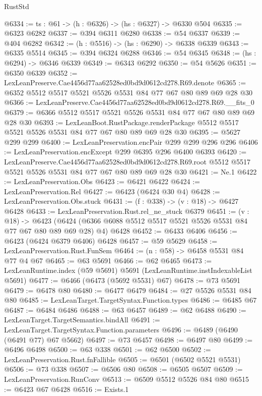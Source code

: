 \begin{lexlean}{RustStd}
\begin{coremodule}
@6334 := {ts : @61} -> (h : @6326) -> (hs : @6327) -> @6330 @504
@6335 := @6323 @6282
@6337 := @394 @6311 @6280
@6338 := @54 @6337
@6339 := @404 @6282
@6342 := (h : @5516) -> (hs : @6290) -> @6338 @6339
@6343 := @6335 @5514
@6345 := @394 @6324 @6288
@6346 := @54 @6345
@6348 := (hs : @6294) -> @6346 @6339
@6349 := @6343 @6292
@6350 := @54 @5626
@6351 := @6350 @6339
@6352 := LexLeanPreserve.Cae4456d77aa62528ed0bd9d0612cd278.R69.denote
@6365 := @6352 @5512 @5517 @5521 @5526 @5531 @84 @77 @67 @80 @89 @69 @28 @30
@6366 := LexLeanPreserve.Cae4456d77aa62528ed0bd9d0612cd278.R69.__fits_0
@6379 := @6366 @5512 @5517 @5521 @5526 @5531 @84 @77 @67 @80 @89 @69 @28 @30
@6393 := LexLeanBoot.RustPackage.renderPackage
    @5512
    @5517
    @5521
    @5526
    @5531
    @84
    @77
    @67
    @80
    @89
    @69
    @28
    @30
@6395 := @5627 @299 @299
@6400 := LexLeanPreservation.encPair @299 @299 @296 @296
@6406 := LexLeanPreservation.encExcept @299 @6395 @296 @6400 @6393
@6420 := LexLeanPreserve.Cae4456d77aa62528ed0bd9d0612cd278.R69.root
    @5512
    @5517
    @5521
    @5526
    @5531
    @84
    @77
    @67
    @80
    @89
    @69
    @28
    @30
@6421 := Ne.{1}
@6422 := LexLeanPreservation.Obs
@6423 := @6421 @6422
@6424 := LexLeanPreservation.Rel
@6427 := @6423 (@6424 @30 @4)
@6428 := LexLeanPreservation.Obs.stuck
@6431 := (f : @338) -> (v : @18) -> @6427 @6428
@6433 := LexLeanPreservation.Rust.rel_ne_stuck @6379
@6451 := (v : @18) ->
  @6423 (@6424 (@6366 @6088 @5512 @5517 @5521 @5526 @5531 @84 @77 @67 @80 @89 @69 @28) @4) @6428
@6452 := @6433 @6406
@6456 := @6423 (@6424 @6379 @6406) @6428
@6457 := @59 @5629
@6458 := LexLeanPreservation.Rust.FunSem
@6464 := (n : @58) -> @6458 @5531 @84 @77 @4 @67
@6465 := @63 @5691
@6466 := @62 @6465
@6473 := LexLeanRuntime.index (@59 @5691) @5691 (LexLeanRuntime.instIndexableList @5691)
@6477 := @6466 (@6473 (@5692 @5531) @67)
@6478 := @73 @5691
@6479 := @6478 @80
@6480 := @6477 @6479
@6484 := @27 @5526 @5531 @84 @80
@6485 := LexLeanTarget.TargetSyntax.Function.types
@6486 := @6485 @67
@6487 := @6484 @6486
@6488 := @63 @6457
@6489 := @62 @6488
@6490 := LexLeanTarget.TargetSemantics.bindAll
@6491 := LexLeanTarget.TargetSyntax.Function.parameters
@6496 := @6489 (@6490 (@6491 @77) @67 @5662)
@6497 := @73 @6457
@6498 := @6497 @80
@6499 := @6496 @6498
@6500 := @63 @338
@6501 := @62 @6500
@6502 := LexLeanPreservation.Rust.fnFallible
@6505 := @6501 (@6502 @5521 @5531)
@6506 := @73 @338
@6507 := @6506 @80
@6508 := @6505 @6507
@6509 := LexLeanPreservation.RunConv
@6513 := @6509 @5512 @5526 @84 @80
@6515 := @6423 @67 @6428
@6516 := Exists.{1}

\end{coremodule}
\end{lexlean}
